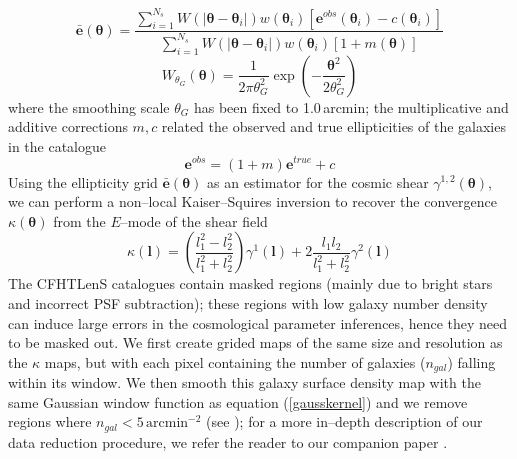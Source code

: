 \documentclass[reprint,aps,prd,superscriptaddress,showkeys,showpacs]{revtex4-1}
\begin{document}
\begin{equation}
\bar{\mathbf{e}}(\pmb{\theta}) = \frac{\sum_{i=1}^{N_s} W(\vert\pmb{\theta}-\pmb{\theta}_i\vert)w(\pmb{\theta}_i)[\mathbf{e}^{obs}(\pmb{\theta}_i)-c(\pmb{\theta}_i)]}{\sum_{i=1}^{N_s}W(\vert\pmb{\theta}-\pmb{\theta}_i\vert)w(\pmb{\theta}_i)[1+m(\pmb{\theta})]}
\end{equation} 
\begin{equation}
\label{gausskernel}
W_{\theta_G}(\pmb{\theta}) = \frac{1}{2\pi\theta_G^2}\exp{\left(-\frac{\pmb{\theta}^2}{2\theta_G^2}\right)}
\end{equation}
%
where the smoothing scale $\theta_G$ has been fixed to 1.0\,arcmin; the multiplicative and additive corrections $m,c$ related the observed and true ellipticities of the galaxies in the catalogue
\begin{equation}
\mathbf{e}^{obs} = (1+m)\mathbf{e}^{true} + c
\end{equation}
%
Using the ellipticity grid $\bar{\mathbf{e}}(\pmb{\theta})$ as an estimator for the cosmic shear $\gamma^{1,2}(\pmb{\theta})$, we can perform a non--local Kaiser--Squires inversion to recover the convergence $\kappa(\pmb{\theta})$ from the $E$--mode of the shear field
%
\begin{equation}
\kappa(\mathbf{l}) = \left(\frac{l_1^2-l_2^2}{l_1^2+l_2^2}\right)\gamma^1(\mathbf{l}) + 2\frac{l_1l_2}{l_1^2+l_2^2}\gamma^2(\mathbf{l})
\end{equation}
%
The CFHTLenS catalogues contain masked regions (mainly due to bright stars and incorrect PSF subtraction); these regions with low galaxy number density can induce large errors in the cosmological parameter inferences, hence they need to be masked out. We first create grided maps of the same size and resolution as the $\kappa$ maps, but with each pixel containing the number of galaxies ($n_{gal}$) falling within its window. We then smooth this galaxy surface density map with the same Gaussian window function as equation (\ref{gausskernel}) and we remove regions where $n_{gal} < 5 \,\mathrm{arcmin}^{−2}$ (see \citep{CFHTMasato}); for a more in--depth description of our data reduction procedure, we refer the reader to our companion paper \citep{Companion}. 

\end{document}
